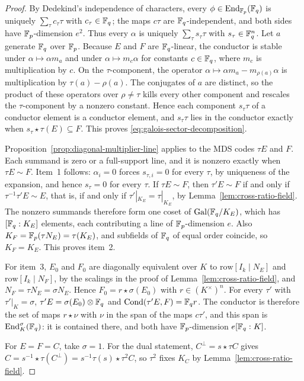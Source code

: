 \begin{proof}
By Dedekind's independence of characters, every
\(\phi\in\operatorname{End}_{\mathbb F_p}(\mathbb F_q)\) is uniquely \(\sum_\tau c_\tau\tau\) with
\(c_\tau\in\mathbb F_q\); the maps \(c\tau\) are \(\mathbb F_q\)-independent, and both
sides have \(\mathbb F_p\)-dimension \(e^2\).  Thus every \(\alpha\) is uniquely
\(\sum_\tau s_\tau\tau\) with \(s_\tau\in\mathbb F_q^n\).  Let \(a\) generate
\(\mathbb F_q\) over \(\mathbb F_p\).  Because \(E\) and \(F\) are \(\mathbb F_q\)-linear, the
conductor is stable under \(\alpha\mapsto\alpha m_a\) and under
\(\alpha\mapsto m_c\alpha\) for constants \(c\in\mathbb F_q\), where \(m_c\) is
multiplication by \(c\).  On the \(\tau\)-component, the operator
\(\alpha\mapsto\alpha m_a-m_{\rho(a)}\alpha\) is multiplication by
\(\tau(a)-\rho(a)\).  The conjugates of \(a\) are distinct, so the product of
these operators over \(\rho\ne\tau\) kills every other component and
rescales the \(\tau\)-component by a nonzero constant.  Hence each
component \(s_\tau\tau\) of a conductor element is a conductor element, and
\(s_\tau\tau\) lies in the conductor exactly when
\(s_\tau\star\tau(E)\subseteq F\).  This proves
\eqref{eq:galois-sector-decomposition}.

Proposition~\ref{prop:diagonal-multiplier-line} applies to the MDS codes
\(\tau E\) and \(F\).  Each summand is zero or a full-support line, and it
is nonzero exactly when \(\tau E\sim F\).  Item~1 follows: \(\alpha_i=0\)
forces \(s_{\tau,i}=0\) for every \(\tau\), by uniqueness of the expansion,
and hence \(s_\tau=0\) for every \(\tau\).  If \(\tau E\sim F\), then
\(\tau'E\sim F\) if and only if \(\tau^{-1}\tau'E\sim E\), that is, if and
only if \(\tau'|_{K_E}=\tau|_{K_E}\), by Lemma~\ref{lem:cross-ratio-field}.
The nonzero summands therefore form one coset of
\(\mathrm{Gal}(\mathbb F_q/K_E)\), which has \([\mathbb F_q:K_E]\) elements, each
contributing a line of \(\mathbb F_p\)-dimension \(e\).  Also
\(K_F=\mathbb F_p(\tau N_E)=\tau(K_E)\), and subfields of \(\mathbb F_q\) of equal order
coincide, so \(K_F=K_E\).  This proves item~2.

For item~3, \(E_0\) and \(F_0\) are diagonally equivalent over \(K\) to
\(\mathrm{row}[I_k\mid N_E]\) and \(\mathrm{row}[I_k\mid N_F]\), by the
scalings in the proof of Lemma~\ref{lem:cross-ratio-field}, and
\(N_F=\tau N_E=\sigma N_E\).  Hence \(F_0=r\star\sigma(E_0)\) with
\(r\in(K^\times)^n\).  For every \(\tau'\) with \(\tau'|_K=\sigma\),
\(\tau'E=\sigma(E_0)\otimes\mathbb F_q\) and
\(\operatorname{Cond}(\tau'E,F)=\mathbb F_q r\).  The conductor is therefore the set of maps
\(r\star\nu\) with \(\nu\) in the span of the maps \(c\tau'\), and this span
is \(\operatorname{End}_K^\sigma(\mathbb F_q)\): it is contained there, and both have
\(\mathbb F_p\)-dimension \(e[\mathbb F_q:K]\).

For \(E=F=C\), take \(\sigma=1\).  For the dual statement,
\(C^\perp=s\star\tau C\) gives
\(C=s^{-1}\star\tau(C^\perp)=s^{-1}\tau(s)\star\tau^2C\), so \(\tau^2\)
fixes \(K_C\) by Lemma~\ref{lem:cross-ratio-field}.
\end{proof}

